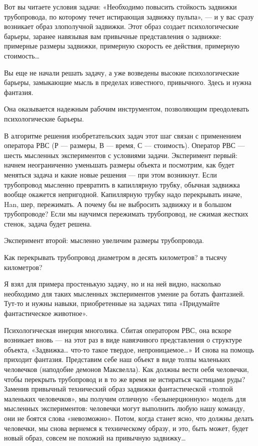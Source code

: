 Вот вы  читаете условия  задачи: «Необходимо  повысить стойкость  задвижки
трубопровода, по которому  течет истирающая  задвижку пульпа», —  и у  вас
сразу  возникает   образ   злополучной  задвижки.   Этот   образ   создает
психологические барьеры, заранее навязывая  вам привычные представления  о
задвижке: примерные  размеры  задвижки, примерную  скорость  ее  действия,
примерную стоимость…

Вы еще не начали  решать задачу, а  уже возведены высокие  психологические
барьеры, замыкающие мысль в пределах известного, привычного. Здесь и нужна
фантазия.

Она оказывается  надежным рабочим  инструментом, позволяющим  преодолевать
психологические барьеры.

В алгоритме решения изобретательских задач  этот шаг связан с  применением
оператора РВС (Р  — размеры, В  — время,  С — стоимость).  Оператор РВС  —
шесть мысленных  экспериментов  с условиями  задачи.  Эксперимент  первый:
начнем неограниченно  уменьшать размеры  объекта  и посмотрим,  как  будет
меняться  задача  и  какие  новые  решения  —  при  этом  возникнут.  Если
трубопровод мысленно  превратить в  капиллярную трубку,  обычная  задвижка
вообще окажется непригодной.  Капиллярную трубку  надо перекрывать  иначе,
Han, шер,  пережимать. А  почему  бы не  выбросить  задвижку и  в  большом
трубопроводе? Если мы научимся  пережимать трубопровод, не сжимая  жестких
стенок, задача будет решена.

Эксперимент второй: мысленно увеличим размеры трубопровода.

Как перекрывать  трубопровод  диаметром  в  десять  километров?  в  тысячу
километров?

Я взял  для примера  простенькую  задачу, но  и  на ней  видно,  насколько
необходимо для таких мысленных  экспериментов умение ра ботать  фантазией.
Тут-то  и  нужны  навыки,   приобретенные  на  задачах  типа   «Придумайте
фантастическое животное».

Психологическая инерция  многолика.  Сбитая  оператором  РВС,  она  вскоре
возникает вновь — на этот раз в виде навязчивого представления о структуре
объекта, «Задвижка…  что-то  такое  твердое, непроницаемое…»  И  снова  на
помощь  приходит  фантазия.  Представим  себе  наш  объект  в  виде  толпы
маленьких человечков (наподобие демонов Максвелла). Как должны вести  оебя
человечки, чтобы  перекрыть трубопровод  и  в то  же время  не  истираться
частицами   руды?   Заменив    привычный   технический   образ    задвижки
фантастической  «толпой   маленьких  человечков»,   мы  получим   отличную
«безынерционную»  модель  для  мысленных  экспериментов:  человечки  могут
выполнить любую нашу  команду, они  не боятся  слова «невозможно».  Потом,
когда станет  ясно,  что должны  делать  человечки, мы  снова  вернемся  к
техническому образу,  и это,  быть  может, будет  новый образ,  совсем  не
похожий на привычную задвижку…

